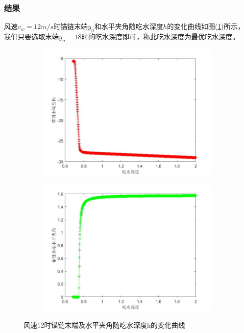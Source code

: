         \subsubsection{结果}
            \par
            风速$v_w=12m/s$时锚链末端$y_n$和水平夹角随吃水深度$h$的变化曲线如图(\ref{风速12时锚链末端及水平夹角随吃水深度h的变化曲线})所示，我们只要选取末端$y_n = 18$时的吃水深度即可，称此吃水深度为最优吃水深度。
            \begin{figure}[H]
                \centering
                \begin{subfigure}[b]{0.4\textwidth}
                    \includegraphics[width=\textwidth]{images/v_wind_12_yn_h.jpg}
                \end{subfigure}
                \begin{subfigure}[b]{0.4\textwidth}
                    \includegraphics[width=\textwidth]{images/v_wind_12_alpha_h.jpg}
                \end{subfigure}
                \caption{风速12时锚链末端及水平夹角随吃水深度h的变化曲线}
                \label{风速12时锚链末端及水平夹角随吃水深度h的变化曲线}
            \end{figure}
